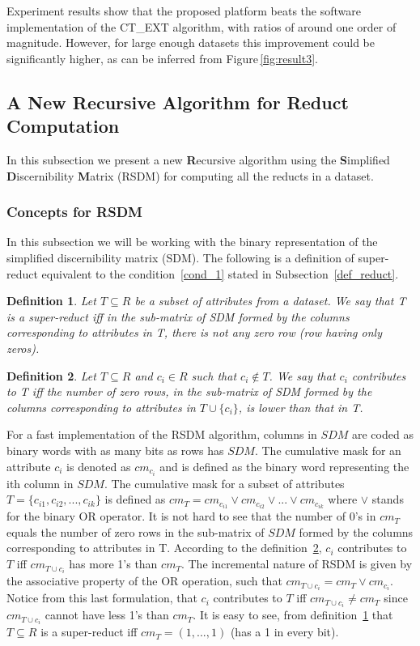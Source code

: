 \documentclass[authoryear,11pt]{elsarticle}
\newtheorem{definition}{Definition}
\begin{document}
	Experiment results show that the proposed platform beats the software implementation of
	the CT\_EXT algorithm, with ratios of around one order of magnitude. However, for large 
	enough datasets this improvement could be significantly higher, as can be inferred from 
	Figure\,\ref{fig:result3}.


\subsection{A New Recursive Algorithm for Reduct Computation}
	In this subsection we present a new \textbf{R}ecursive algorithm using the \textbf{S}implified 
	\textbf{D}iscernibility \textbf{M}atrix (RSDM) for computing all the reducts in a dataset. 

\subsubsection{Concepts for RSDM}
	In this subsection we will be working with the binary representation of the simplified discernibility matrix
	(SDM). The following is a definition of super-reduct equivalent to the condition~\ref{cond_1} stated in 
	Subsection~\ref{def_reduct}.
	
	\begin{definition}\label{def:testor}
		Let $T \subseteq R$ be a subset of attributes from a dataset. We say that T is a super-reduct iff in the
		sub-matrix of SDM formed by the columns corresponding to attributes in T, there is not any zero row (row 
		having only zeros).
	\end{definition}
		
	\begin{definition}\label{def:contrib}
		Let $T \subseteq R$ and  $c_i \in R$ such that $c_i \notin T$. We say that $c_i$ contributes to T iff the
		number of zero rows, in the sub-matrix of SDM formed by the columns corresponding to attributes in 
		$T\cup\{c_i\}$, is lower than that in T.
	\end{definition}		
		
	For a fast implementation of the RSDM algorithm, columns in $SDM$ are coded as binary words with as many 
	bits as 	rows has $SDM$. The cumulative mask for an attribute $c_i$ is denoted as $cm_{c_i}$ and is defined as 
	the binary word representing the ith column in $SDM$. The cumulative mask for a subset of attributes $T=\lbrace
	c_{i1},c_{i2},...,c_{ik} \rbrace$ is defined	as $cm_T = cm_{c_{i1}} \vee cm_{c_{i2}} \vee ... \vee cm_{c_{ik}}$
	where $\vee$ stands for the binary OR operator. It is not hard to see that the number of 0's in $cm_T$ equals
	the number of zero rows in the sub-matrix of $SDM$ formed by the columns corresponding to attributes in T. 
	According to the definition~\ref{def:contrib}, $c_i$ contributes to $T$ iff $cm_{T\cup c_i}$ has more 1's than 
	$cm_T$. 	The incremental nature of RSDM is given by the associative property of the OR operation, such that 
	$cm_{T\cup c_i}=cm_T\vee cm_{c_i}$. Notice from this last formulation, that $c_i$ contributes to $T$ iff 
	$cm_{T\cup c_i}\neq cm_T$ since $cm_{T\cup c_i}$ cannot have less 1's than $cm_T$. It is easy to see, from 
	definition~\ref{def:testor} that $T \subseteq R$ is a super-reduct iff $cm_T=(1,...,1)$ (has a 1 in every bit).
	
\end{document}
